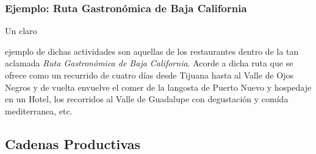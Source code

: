 \documentclass[stu, 12pt, letterpaper, donotrepeattitle, floatsintext, natbib]{apa7}
\begin{document}
\subsubsection{Ejemplo: Ruta Gastronómica de Baja California}
Un claro \begin{justifying}
    ejemplo de dichas actividades son aquellas de los restaurantes dentro de la tan aclamada \emph{Ruta Gastronómica de Baja California}. Acorde a \cite{unknown-author-no-dateB} %
    dicha ruta que se ofrece como un recurrido de cuatro días desde Tijuana hasta al Valle de Ojos Negros y de vuelta envuelve
    el comer de la langosta de Puerto Nuevo y hospedaje en un Hotel, los recorridos al Valle de Guadalupe con degustación y comída mediterranea, etc.\par
\end{justifying}
\vspace{\baselineskip}
\subsection{Cadenas Productivas}
\end{document}
